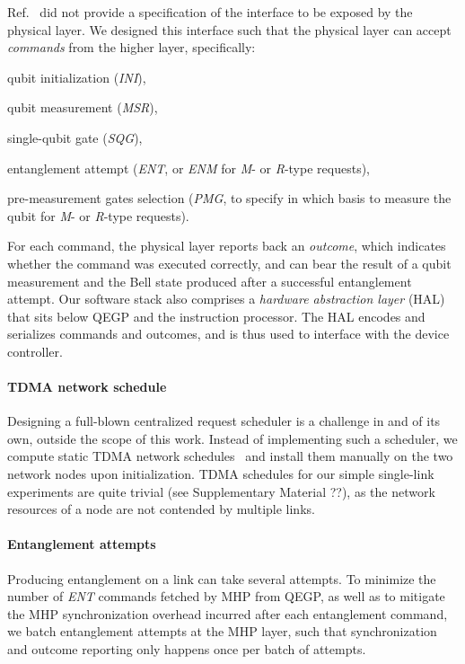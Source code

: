 Ref.~\cite{dahlberg_2019_egp} did not provide a specification of the interface to be exposed by the
physical layer. We designed this interface such that the physical layer can accept \emph{commands}
from the higher layer, specifically:
%
\begin{enumerate*}[label=(\alph*)]
    \item qubit initialization (\emph{INI}),
    \item qubit measurement (\emph{MSR}),
    \item single-qubit gate (\emph{SQG}),
    \item entanglement attempt (\emph{ENT}, or \emph{ENM} for \emph{M}- or \emph{R}-type requests),
    \item pre-measurement gates selection (\emph{PMG}, to specify in which basis to measure the
          qubit for \emph{M}- or \emph{R}-type requests).
\end{enumerate*}
For each command, the physical layer reports back an \emph{outcome}, which indicates whether the
command was executed correctly, and can bear the result of a qubit measurement and the Bell state
produced after a successful entanglement attempt. Our software stack also comprises a \emph{hardware
    abstraction layer} (HAL) that sits below QEGP and the instruction processor. The HAL encodes and
serializes commands and outcomes, and is thus used to interface with the device controller.

\paragraph{TDMA network schedule}

Designing a full-blown centralized request scheduler is a challenge in and of its own, outside the
scope of this work. Instead of implementing such a scheduler, we compute static TDMA network
schedules~\cite{skrzypczyk_2021_arch} and install them manually on the two network nodes upon
initialization. TDMA schedules for our simple single-link experiments are quite trivial (see
Supplementary Material ??), as the network resources of a node are not contended by multiple links.

\paragraph{Entanglement attempts}

Producing entanglement on a link can take several attempts. To minimize the number of \emph{ENT}
commands fetched by MHP from QEGP, as well as to mitigate the MHP synchronization overhead incurred
after each entanglement command, we batch entanglement attempts at the MHP layer, such that
synchronization and outcome reporting only happens once per batch of attempts.

